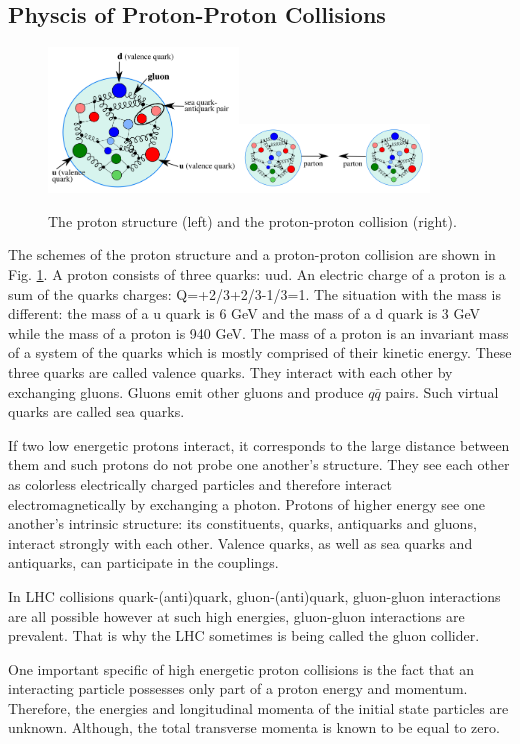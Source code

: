 \subsection{Physcis of Proton-Proton Collisions}

\begin{figure}[htb]
  \begin{center}
    {\includegraphics[width=0.45\textwidth]{../figs/Intro/protonStructure.png}\includegraphics[width=0.45\textwidth]{../figs/Intro/ppCollision.png}}
    \caption{The proton structure (left) and the proton-proton collision (right).}
    \label{fig:ppCollision}
  \end{center}
\end{figure}

The schemes of the proton structure and a proton-proton collision are shown in Fig. \ref{fig:ppCollision}. A proton consists of three quarks: uud. An electric charge of a proton is a sum of the quarks charges: Q=+2/3+2/3-1/3=1. The situation with the mass is different: the mass of a u quark is 6 GeV and the mass of a d quark is 3 GeV while the mass of a proton is 940 GeV. The mass of a proton is an invariant mass of a system of the quarks which is mostly comprised of their kinetic energy. These three quarks are called valence quarks. They interact with each other by exchanging gluons. Gluons emit other gluons and produce $q\bar{q}$ pairs. Such virtual quarks are called sea quarks.

If two low energetic protons interact, it corresponds to the large distance between them and such protons do not probe one another's structure. They see each other as colorless electrically charged particles and therefore interact electromagnetically by exchanging a photon. Protons of higher energy see one another's intrinsic structure: its constituents, quarks, antiquarks and gluons, interact strongly with each other. Valence quarks, as well as sea quarks and antiquarks, can participate in the couplings.

In LHC collisions quark-(anti)quark, gluon-(anti)quark, gluon-gluon interactions are all possible however at such high energies, gluon-gluon interactions are prevalent. That is why the LHC sometimes is being called the gluon collider.

One important specific of high energetic proton collisions is the fact that an interacting particle possesses only part of a proton energy and momentum. Therefore, the energies and longitudinal momenta of the initial state particles are unknown. Although, the total transverse momenta is known to be equal to zero.  
